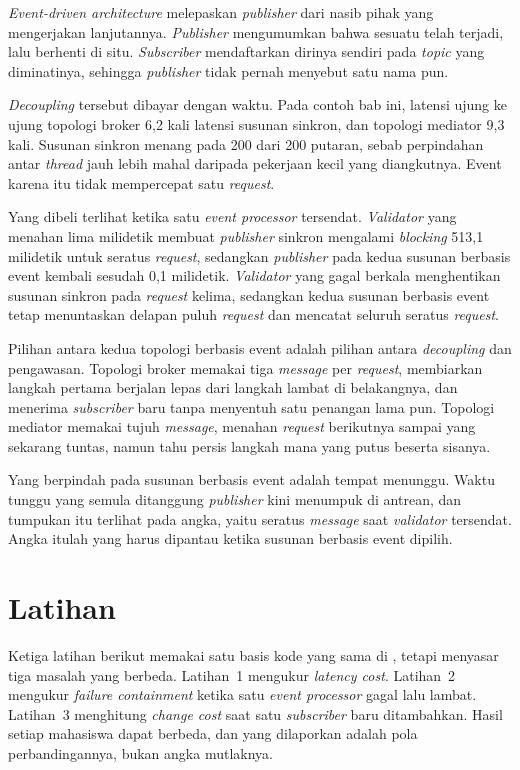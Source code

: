 \textit{Event-driven architecture} melepaskan \textit{publisher} dari nasib pihak yang
mengerjakan lanjutannya. \textit{Publisher} mengumumkan bahwa sesuatu telah terjadi, lalu
berhenti di situ. \textit{Subscriber} mendaftarkan dirinya sendiri pada \textit{topic} yang
diminatinya, sehingga \textit{publisher} tidak pernah menyebut satu nama pun.

\textit{Decoupling} tersebut dibayar dengan waktu. Pada contoh bab ini, latensi ujung
ke ujung topologi broker 6,2 kali latensi susunan sinkron, dan topologi mediator
9,3 kali. Susunan sinkron menang pada 200 dari 200 putaran, sebab perpindahan
antar \textit{thread} jauh lebih mahal daripada pekerjaan kecil yang
diangkutnya. Event karena itu tidak mempercepat satu \textit{request}.

Yang dibeli terlihat ketika satu \textit{event processor} tersendat. \textit{Validator} yang menahan
lima milidetik membuat \textit{publisher} sinkron mengalami \textit{blocking} 513,1 milidetik untuk seratus
\textit{request}, sedangkan \textit{publisher} pada kedua susunan berbasis event kembali
sesudah 0,1 milidetik. \textit{Validator} yang gagal berkala menghentikan susunan
sinkron pada \textit{request} kelima, sedangkan kedua susunan berbasis event tetap
menuntaskan delapan puluh \textit{request} dan mencatat seluruh seratus \textit{request}.

Pilihan antara kedua topologi berbasis event adalah pilihan antara
\textit{decoupling} dan pengawasan. Topologi broker memakai tiga \textit{message} per \textit{request}, membiarkan
langkah pertama berjalan lepas dari langkah lambat di belakangnya, dan menerima
\textit{subscriber} baru tanpa menyentuh satu penangan lama pun. Topologi mediator
memakai tujuh \textit{message}, menahan \textit{request} berikutnya sampai yang sekarang tuntas,
namun tahu persis langkah mana yang putus beserta sisanya.

Yang berpindah pada susunan berbasis event adalah tempat menunggu. Waktu tunggu
yang semula ditanggung \textit{publisher} kini menumpuk di antrean, dan tumpukan itu
terlihat pada angka, yaitu seratus \textit{message} saat \textit{validator} tersendat.
Angka itulah yang harus dipantau ketika susunan berbasis event dipilih.

\section{Latihan}

Ketiga latihan berikut memakai satu basis kode yang sama di
, tetapi menyasar tiga masalah yang berbeda.
Latihan~1 mengukur \textit{latency cost}. Latihan~2 mengukur
\textit{failure containment} ketika satu \textit{event processor} gagal lalu lambat.
Latihan~3 menghitung \textit{change cost} saat satu \textit{subscriber} baru
ditambahkan.
Hasil setiap mahasiswa dapat berbeda, dan yang dilaporkan adalah pola
perbandingannya, bukan angka mutlaknya.

